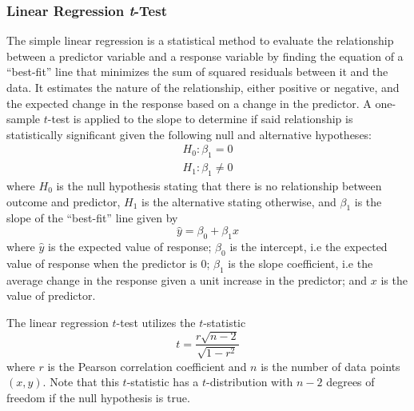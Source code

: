\subsubsection{Linear Regression \textit{t}-Test}
\hfill \break 
The simple linear regression is a statistical method to evaluate the relationship between a predictor variable and a response variable by finding the equation of a ``best-fit'' line that minimizes the sum of squared residuals between it and the data. It estimates the nature of the relationship, either positive or negative, and the expected change in the response based on a change in the predictor. A one-sample $t$-test is applied to the slope to determine if said relationship is statistically significant given the following null and alternative hypotheses:
\begin{equation}
\begin{array}{c}
    H_0: \beta_1 = 0 \\
    H_1: \beta_1 \neq 0
\end{array}
\end{equation}
where \(H_0\) is the null hypothesis stating that there is  no relationship between outcome and predictor,  \(H_1\) is the alternative stating otherwise, and $\beta_1$ is the slope of the ``best-fit'' line given by
\begin{equation}
    \hat{y} = \beta_0 + \beta_1x
\end{equation}
where \(\hat{y}\) is the expected value of response; \(\beta_0\) is the intercept, i.e the expected value of response when the predictor is 0; \(\beta_1\) is the slope coefficient, i.e the average change in the response given a unit increase in the predictor; and $x$ is the value of predictor.

The linear regression $t$-test utilizes the $t$-statistic
\begin{equation}
    t=\frac{r\sqrt{n-2}}{\sqrt{1-r^2}}
\end{equation}
where $r$ is the Pearson correlation coefficient and $n$ is the number of data points $(x,y)$. Note that this $t$-statistic has a $t$-distribution with $n-2$ degrees of freedom if the null hypothesis is true.

